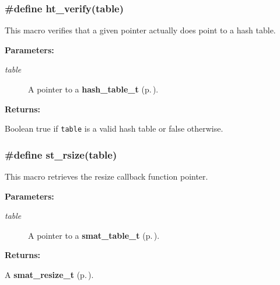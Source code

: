 \subsubsection{\setlength{\rightskip}{0pt plus 5cm}\#define ht\_\-verify(table)}\label{group__dbprim__hash_a19}




 This macro verifies that a given pointer actually does point to a hash table.\begin{Desc}
\item[{\bf Parameters: }]\par
\begin{description}
\item[
{\em table}]A pointer to a {\bf hash\_\-table\_\-t} {\rm (p.\,\pageref{group__dbprim__hash_a0})}.

\end{description}
\end{Desc}
\begin{Desc}
\item[{\bf Returns: }]\par
Boolean true if {\tt table} is a valid hash table or false otherwise. \end{Desc}
\subsubsection{\setlength{\rightskip}{0pt plus 5cm}\#define st\_\-rsize(table)}\label{group__dbprim__hash_a37}




 This macro retrieves the resize callback function pointer.\begin{Desc}
\item[{\bf Parameters: }]\par
\begin{description}
\item[
{\em table}]A pointer to a {\bf smat\_\-table\_\-t} {\rm (p.\,\pageref{group__dbprim__smat_a0})}.

\end{description}
\end{Desc}
\begin{Desc}
\item[{\bf Returns: }]\par
A {\bf smat\_\-resize\_\-t} {\rm (p.\,\pageref{group__dbprim__smat_a3})}. \end{Desc}


